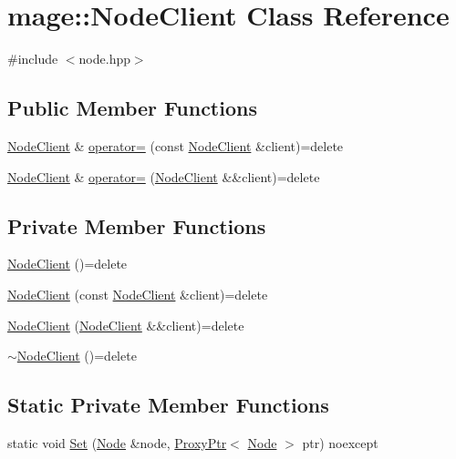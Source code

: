 \hypertarget{classmage_1_1_node_client}{}\section{mage\+:\+:Node\+Client Class Reference}
\label{classmage_1_1_node_client}


{\ttfamily \#include $<$node.\+hpp$>$}

\subsection*{Public Member Functions}
\begin{DoxyCompactItemize}
\item 
\hyperlink{classmage_1_1_node_client}{Node\+Client} \& \hyperlink{classmage_1_1_node_client_a17f705ea878c04485c18d5a57b8c4aac}{operator=} (const \hyperlink{classmage_1_1_node_client}{Node\+Client} \&client)=delete
\item 
\hyperlink{classmage_1_1_node_client}{Node\+Client} \& \hyperlink{classmage_1_1_node_client_ac61c9ad2a8f0f443779a2eb1e049b5c9}{operator=} (\hyperlink{classmage_1_1_node_client}{Node\+Client} \&\&client)=delete
\end{DoxyCompactItemize}
\subsection*{Private Member Functions}
\begin{DoxyCompactItemize}
\item 
\hyperlink{classmage_1_1_node_client_aee91ed554a09bd4a767d2b9fe004a08c}{Node\+Client} ()=delete
\item 
\hyperlink{classmage_1_1_node_client_a2cc014dd71cf408dd65ff95fb26d524d}{Node\+Client} (const \hyperlink{classmage_1_1_node_client}{Node\+Client} \&client)=delete
\item 
\hyperlink{classmage_1_1_node_client_a3fed0bff5d3bb0c83982eb7231132861}{Node\+Client} (\hyperlink{classmage_1_1_node_client}{Node\+Client} \&\&client)=delete
\item 
\hyperlink{classmage_1_1_node_client_a62fe48b254a6daeac617189ba587966f}{$\sim$\+Node\+Client} ()=delete
\end{DoxyCompactItemize}
\subsection*{Static Private Member Functions}
\begin{DoxyCompactItemize}
\item 
static void \hyperlink{classmage_1_1_node_client_a2c3022ac86c892d2d859feb72e9f01b1}{Set} (\hyperlink{classmage_1_1_node}{Node} \&node, \hyperlink{classmage_1_1_proxy_ptr}{Proxy\+Ptr}$<$ \hyperlink{classmage_1_1_node}{Node} $>$ ptr) noexcept
\end{DoxyCompactItemize}

